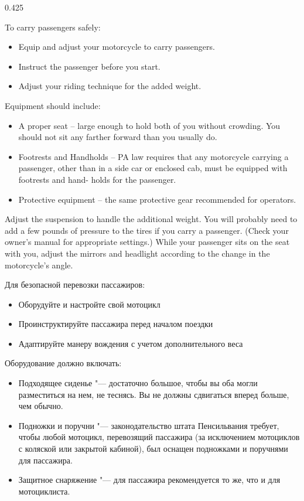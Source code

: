 \begin{langblock}{0.425}
	\begin{eng}
	
	To carry passengers safely:
	\begin{itemize}[noitemsep, nosep]
		\item Equip and adjust your motorcycle to carry passengers.
		\item Instruct the passenger before you start.
		\item Adjust your riding technique for the added weight.  
\end{itemize}	

	\medskip
	Equipment should include:
	\begin{itemize}[noitemsep, nosep]
		\item A proper seat -- large enough to hold both of you without crowding. You should not sit any farther forward than you usually do.
		\item Footrests and Handholds -- PA law requires that any motorcycle carrying a passenger, other than in a side car or enclosed cab, must be equipped with footrests and hand- holds for the passenger.
		\item Protective equipment -- the same protective gear recommended for operators.
	\end{itemize}
	
	Adjust the suspension to handle the additional weight. You will probably need to add a few pounds of pressure to the tires if you carry a passenger. (Check your owner's manual for appropriate settings.) While your passenger sits on the seat with you, adjust the mirrors and headlight according to the change in the motorcycle's angle.
	\end{eng}
	\begin{rus}
		
		Для безопасной перевозки пассажиров:
		\begin{itemize}[noitemsep, nosep]
			\item Оборудуйте и настройте свой мотоцикл
			\item Проинструктируйте пассажира перед началом поездки
			\item Адаптируйте манеру вождения с учетом дополнительного веса
	\end{itemize}	
	
	
	\medskip
	Оборудование должно включать:
	\begin{itemize}[noitemsep, nosep]
			\item Подходящее сиденье "--- достаточно большое, чтобы вы оба могли разместиться на нем, не теснясь. Вы не должны сдвигаться вперед больше, чем обычно.
			\item Подножки и поручни "--- законодательство штата Пенсильвания требует, чтобы любой мотоцикл, перевозящий пассажира (за исключением мотоциклов с коляской или закрытой кабиной), был оснащен подножками и поручнями для пассажира.
			\item Защитное снаряжение "--- для пассажира рекомендуется то же, что и для мотоциклиста.
		\end{itemize}
		

\end{rus}
\end{langblock}
